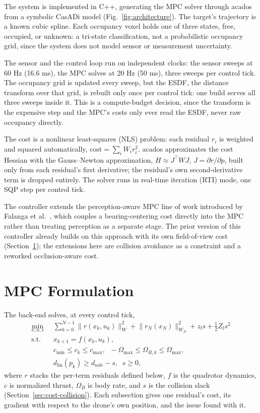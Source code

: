 \documentclass[conference]{IEEEtran}
\begin{document}
The system is implemented in C++, generating the MPC solver through acados \cite{acados} from a symbolic CasADi model (Fig.~\ref{fig:architecture}). The target's trajectory is a known cubic spline. Each occupancy voxel holds one of three states, free, occupied, or unknown: a tri-state classification, not a probabilistic occupancy grid, since the system does not model sensor or measurement uncertainty.

The sensor and the control loop run on independent clocks: the sensor sweeps at 60 Hz (16.6 ms), the MPC solves at 20 Hz (50 ms), three sweeps per control tick. The occupancy grid is updated every sweep, but the ESDF, the distance transform over that grid, is rebuilt only once per control tick: one build serves all three sweeps inside it. This is a compute-budget decision, since the transform is the expensive step and the MPC's costs only ever read the ESDF, never raw occupancy directly.

The cost is a nonlinear least-squares (NLS) problem: each residual $r_i$ is weighted and squared automatically, $\text{cost} = \sum_i W_i r_i^2$. acados approximates the cost Hessian with the Gauss--Newton approximation, $H \approx J^\top W J$, $J = \partial r/\partial p$, built only from each residual's first derivative; the residual's own second-derivative term is dropped entirely. The solver runs in real-time iteration (RTI) mode, one SQP step per control tick.

The controller extends the perception-aware MPC line of work introduced by Falanga et al.\ \cite{falanga_pampc}, which couples a bearing-centering cost directly into the MPC rather than treating perception as a separate stage. The prior version of this controller \cite{pinto_thesis} already builds on this approach with its own field-of-view cost (Section~\ref{sec:mpcform}); the extensions here are collision avoidance as a constraint and a reworked occlusion-aware cost.

\section{MPC Formulation}
\label{sec:mpcform}

The back-end solves, at every control tick,
\begin{equation}
\begin{aligned}
\min_{x,u,s}\;\; & \sum_{k=0}^{N-1} \lVert r(x_k,u_k) \rVert_{W}^2 + \lVert r_N(x_N) \rVert_{W_N}^2 + z_l s + \tfrac{1}{2} Z_l s^2 \\
\text{s.t.}\;\; & x_{k+1} = f(x_k, u_k), \\
& c_{\min} \le c_k \le c_{\max}, \;\; -\Omega_{\max} \le \Omega_{B,k} \le \Omega_{\max}, \\
& d_{\text{lin}}(p_k) \ge d_{\text{safe}} - s, \;\; s \ge 0,
\end{aligned}
\label{eq:mpc}
\end{equation}
where $r$ stacks the per-term residuals defined below, $f$ is the quadrotor dynamics, $c$ is normalized thrust, $\Omega_B$ is body rate, and $s$ is the collision slack (Section~\ref{sec:cost-collision}). Each subsection gives one residual's cost, its gradient with respect to the drone's own position, and the issue found with it.
\end{document}
